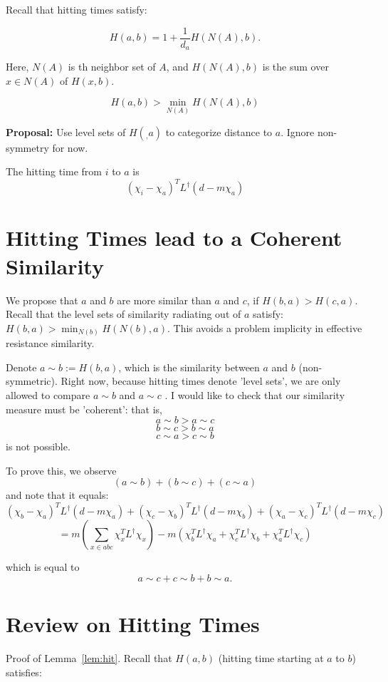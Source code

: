 

Recall that hitting times satisfy:

\[ H(a,b) = 1 + \frac{1}{d_a} H(N(A), b). \]

Here, $N(A)$ is th neighbor set of $A$, and $H(N(A), b)$ is the
sum over $x \in N(A)$ of $H(x, b)$. 

\begin{corollary}
  \[ H(a, b) > \min_{N(A)} H(N(A), b) \]
\end{corollary}

\noindent \textbf{Proposal:} Use level sets of $H(_, a)$ to
categorize distance to $a$. Ignore non-symmetry for now.

\begin{lemma}\label{lem:hit} The hitting time from $i$ to $a$ is 
  \[ (\chi_{i}  - \chi_{a})^T L^\dag (d - m\chi_a) \]
\end{lemma}

\section{Hitting Times lead to a Coherent Similarity}
We propose that $a$ and $b$ are more similar than $a$ and $c$, if
$H(b, a) > H(c, a)$. Recall that the level sets of similarity
radiating out of $a$ satisfy: $H(b, a) > \min_{N(b)} H(N(b), a)$.
This avoids a problem implicity in effective resistance
similarity.

Denote $a \sim b := H(b,a)$, which is the similarity between $a$
and $b$ (non-symmetric).  Right now, because hitting times denote
'level sets', we are only allowed to compare $a \sim b$ and $a
\sim c$ . I would like to check that
our similarity measure must be 'coherent': that is, 
\[ a \sim b > a \sim c \]
\[ b \sim c > b \sim a \]
\[ c \sim a > c \sim b \]
is not possible. 

To prove this, we observe 
\[ (a \sim b) + (b \sim c) + (c \sim a) \]
and note that it equals:
\[ (\chi_{b}  - \chi_{a})^T L^\dag (d - m\chi_a)
+ (\chi_{c}  - \chi_{b})^T L^\dag (d - m\chi_b)
+ (\chi_{a}  - \chi_{c})^T L^\dag (d - m\chi_c) \]
\[ =  m\left(\sum_{x \in abc}  \chi_x^T L^\dag \chi_x\right) -
m\left(\chi_b^T L^\dag
\chi_a + \chi_c^T L^\dag \chi_b + \chi_a^T L^{\dag} \chi_c \right) \]

which is equal to 
\[ a \sim c + c \sim b + b \sim a. \]

\section{Review on Hitting Times}
Proof of Lemma~\ref{lem:hit}. Recall that $H(a,b)$ (hitting time starting at $a$ to $b$)
satisfies:

